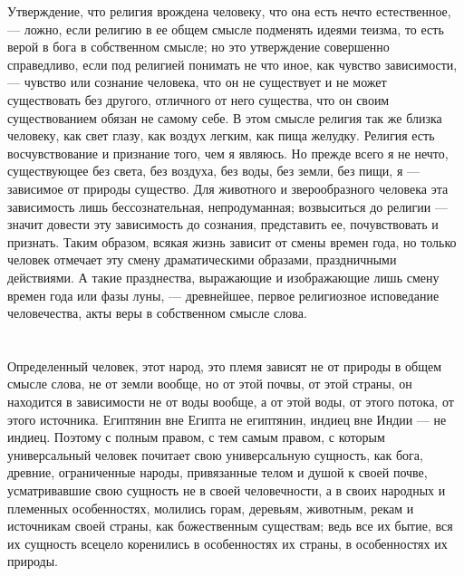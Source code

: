 \documentclass[12pt,oneside]{book}
\begin{document}
Утверждение, что религия врождена человеку, что она есть нечто естественное, --- ложно, если религию в ее общем смысле подменять идеями теизма, то есть верой в бога в собственном смысле; но это утверждение совершенно справедливо, если под религией понимать не что иное, как чувство зависимости, --- чувство или сознание человека, что он не существует и не может существовать без другого, отличного от него существа, что он своим существованием обязан не самому себе. В этом смысле религия так же близка человеку, как свет глазу, как воздух легким, как пища желудку. Религия есть восчувствование и признание того, чем я являюсь. Но прежде всего я не нечто, существующее без света, без воздуха, без воды, без земли, без пищи, я --- зависимое от природы существо. Для животного и зверообразного человека эта зависимость лишь бессознательная, непродуманная; возвыситься до религии --- значит довести эту зависимость до сознания, представить ее, почувствовать и признать. Таким образом, всякая жизнь зависит от смены времен года, но только человек отмечает эту смену драматическими образами, праздничными действиями. А такие празднества, выражающие и изображающие лишь смену времен года или фазы луны, --- древнейшее, первое религиозное исповедание человечества, акты веры в собственном смысле слова.



\chapter{}

Определенный человек, этот народ, это племя зависят не от природы в общем смысле слова, не от земли вообще, но от этой почвы, от этой страны, он находится в зависимости не от воды вообще, а от этой воды, от этого потока, от этого источника. Египтянин вне Египта не египтянин, индиец вне Индии --- не индиец. Поэтому с полным правом, с тем самым правом, с которым универсальный человек почитает свою универсальную сущность, как бога, древние, ограниченные народы, привязанные телом и душой к своей почве, усматривавшие свою сущность не в своей человечности, а в своих народных и племенных особенностях, молились горам, деревьям, животным, рекам и источникам своей страны, как божественным существам; ведь все их бытие, вся их сущность всецело коренились в особенностях их страны, в особенностях их природы.



\chapter{}
\end{document}
